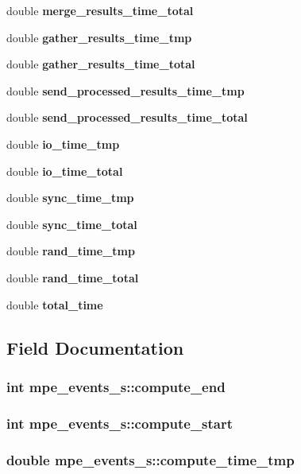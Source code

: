 \begin{CompactItemize}
double \bf{merge\_\-results\_\-time\_\-total}
\item 
double \bf{gather\_\-results\_\-time\_\-tmp}
\item 
double \bf{gather\_\-results\_\-time\_\-total}
\item 
double \bf{send\_\-processed\_\-results\_\-time\_\-tmp}
\item 
double \bf{send\_\-processed\_\-results\_\-time\_\-total}
\item 
double \bf{io\_\-time\_\-tmp}
\item 
double \bf{io\_\-time\_\-total}
\item 
double \bf{sync\_\-time\_\-tmp}
\item 
double \bf{sync\_\-time\_\-total}
\item 
double \bf{rand\_\-time\_\-tmp}
\item 
double \bf{rand\_\-time\_\-total}
\item 
double \bf{total\_\-time}
\end{CompactItemize}


\subsection{Field Documentation}
\subsubsection{\setlength{\rightskip}{0pt plus 5cm}int \bf{mpe\_\-events\_\-s::compute\_\-end}}\label{structmpe__events__s_3d95afc60385c0b22434554dbc2e64f6}


\subsubsection{\setlength{\rightskip}{0pt plus 5cm}int \bf{mpe\_\-events\_\-s::compute\_\-start}}\label{structmpe__events__s_c986a414c6627419b106bd7c6b7e0056}


\subsubsection{\setlength{\rightskip}{0pt plus 5cm}double \bf{mpe\_\-events\_\-s::compute\_\-time\_\-tmp}}\label{structmpe__events__s_75f02fe30349693873320705a9d3d1a5}


